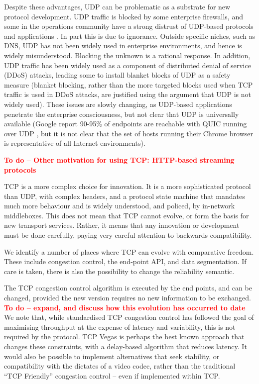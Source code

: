 \documentclass{sig-alternate-05-2015}
\newcommand{\todo}[1]{\textbf{\textcolor{red}{To do -- #1}}}
\begin{document}
Despite these advantages, UDP can be problematic as a substrate for new
protocol development. UDP traffic is blocked by some enterprise firewalls,
and some in the operations community have a strong distrust of UDP-based
protocols and applications \cite{draft-byrne-opsec-udp-advisory-00}. In
part this is due to ignorance. Outside specific niches, such as DNS, UDP
has not been widely used in enterprise environments, and hence is widely
misunderstood. Blocking the unknown is a rational response. In addition,
UDP traffic has been widely used as a component of distributed denial of
service (DDoS) attacks, leading some to install blanket blocks of UDP as 
a safety measure (blanket blocking, rather than the more targeted blocks 
used when TCP traffic is used in DDoS attacks, are justified using the
argument that UDP is not widely used).
These issues are slowly changing, as UDP-based applications penetrate the
enterprise consciousness, but not clear that UDP is universally available
(Google report 90-95\% of endpoints are reachable with QUIC
running over UDP \cite{roskind2013quic}, but it is not clear that the set
of hosts running their Chrome browser is representative of all Internet
environments). 

\todo{Other motivation for using TCP: HTTP-based streaming protocols}

TCP is a more complex choice for innovation. It is a more sophisticated 
protocol than UDP, with complex headers, and a protocol state machine
that mandates much more behaviour and is widely understood, and policed,
by in-network middleboxes. This does not mean that TCP cannot evolve, or
form the basis for new transport services. Rather, it means that any
innovation or development must be done carefully, paying very careful
attention to backwards compatibility.

We identify a number of places where TCP can evolve with comparative
freedom. These include congestion control, the end-point API, and data
segmentation. If care is taken, there is also the possibility to change
the reliability semantic. 

The TCP congestion control algorithm is executed by the end points, and 
can be changed, provided the new version requires no new information to 
be exchanged. 
\todo{expand, and discuss how this evolution has occurred to date}
We note that, while standardised TCP congestion control has followed the
goal of maximising throughput at the expense of latency and variability,
this is not required by the protocol. TCP Vegas \cite{brakmo:1994:tcp-vegas}
is perhaps the best known approach that changes these constraints, with a
delay-based algorithm that reduces latency. It would also be possible to
implement alternatives that seek stability, or compatibility with the
dictates of a video codec, rather than the traditional ``TCP Friendly''
congestion control -- even if implemented within TCP.
\end{document}
